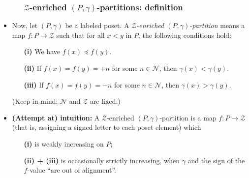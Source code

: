 \documentclass{beamer}
\newcommand{\calN}{\mathcal{N}}
\newcommand{\calZ}{\mathcal{Z}}
\newcommand{\fti}[1]{\frametitle{\ \ \ \ \ #1}}
\newcommand{\tup}[1]{\left( #1 \right)}
\newcommand{\defn}[1]{{\color{darkred}\emph{#1}}} %
\theoremstyle{plain}
\begin{document}
\begin{frame}
\fti{$\calZ$-enriched $\tup{P,\gamma}$-partitions: definition}

\begin{itemize}

\item Now, let $\left(  P,\gamma\right)  $ be a labeled poset. A
\defn{$\mathcal{Z}$-enriched $\left(  P,\gamma\right)  $-partition}
means a map $f:P\rightarrow\mathcal{Z}$ such that for all $x<y$ in $P$, the
following conditions hold:

\begin{enumerate}
\item[\textbf{(i)}] We have $f\left(  x\right)  \preccurlyeq f\left(
y\right)  $.

\item[\textbf{(ii)}] If $f\left(  x\right)  =f\left(  y\right)  =+n$ for some
$n\in\mathcal{N}$, then $\gamma\left(  x\right)  <\gamma\left(  y\right)  $.

\item[\textbf{(iii)}] If $f\left(  x\right)  =f\left(  y\right)  =-n$ for some
$n\in\mathcal{N}$, then $\gamma\left(  x\right)  >\gamma\left(  y\right)  $.
\end{enumerate}

(Keep in mind: $\calN$ and $\calZ$ are fixed.)

\pause

\item \textbf{(Attempt at) intuition:}
      A $\calZ$-enriched $\tup{P,\gamma}$-partition is a map
      $f : P \to \calZ$ (that is, assigning a signed letter to each poset
      element) which
      \begin{enumerate}
      \item[\textbf{(i)}] is weakly increasing on $P$;
      \item[\textbf{(ii) + (iii)}] is occasionally strictly increasing,
                                   when $\gamma$ and the sign of the
                                   $f$-value ``are out of alignment''.
      \end{enumerate}

\end{itemize}

\end{frame}
\end{document}
